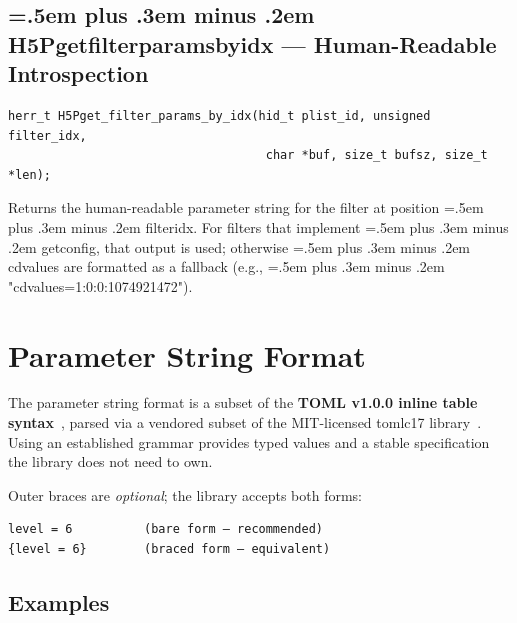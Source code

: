 \documentclass[letterpaper,hyper]{HDF5_RFC}
\renewcommand{\texttt}[1]{\begingroup\small\ttfamily\hyphenchar\font=45
  \spaceskip=.5em plus .3em minus .2em #1\endgroup}
\renewcommand{\_}{\oldtextunderscore\allowbreak}
\begin{document}
\subsection{\texttt{H5Pget\_filter\_params\_by\_idx} — Human-Readable Introspection}

\begin{verbatim}
herr_t H5Pget_filter_params_by_idx(hid_t plist_id, unsigned filter_idx,
                                    char *buf, size_t bufsz, size_t *len);
\end{verbatim}

Returns the human-readable parameter string for the filter at position
\texttt{filter\_idx}.  For filters that implement \texttt{get\_config}, that
output is used; otherwise \texttt{cd\_values} are formatted as a fallback
(e.g., \texttt{"cd\_values=1:0:0:1074921472"}).

\section{Parameter String Format}

The parameter string format is a subset of the \textbf{TOML v1.0.0 inline
table syntax}~\cite{toml10}, parsed via a vendored subset of the MIT-licensed
tomlc17 library~\cite{tomlc17}.  Using an established grammar provides typed
values and a stable specification the library does not need to own.

Outer braces are \emph{optional}; the library accepts both forms:

\begin{verbatim}
level = 6          (bare form — recommended)
{level = 6}        (braced form — equivalent)
\end{verbatim}

\subsection{Examples}
\end{document}
